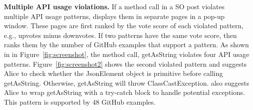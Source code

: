 {\bf Multiple API usage violations.} If a method call in a SO post violates multiple API usage patterns, {\tool} displays them in separate pages in a pop-up window. These pages are first ranked by the vote score of each violated pattern, e.g., upvotes minus downvotes. If two patterns have the same vote score, {\tool} then ranks them by the number of GitHub examples that support a pattern. As shown in  in Figure~\ref{fig:screenshot}, the method call, {\ttt getAsString} violates four API usage patterns. Figure~\ref{fig:screenshot2} shows the second violated pattern and suggests Alice to check whether the {\ttt JsonElement} object is primitive before calling {\ttt getAsString}. Otherwise, {\ttt getAsString} will throw {\ttt ClassCastException}. {\tool} also suggests Alice to wrap {\ttt getAsString} with a {\ttt try-catch} block to handle potential exceptions. This pattern is supported by 48 GitHub examples.





